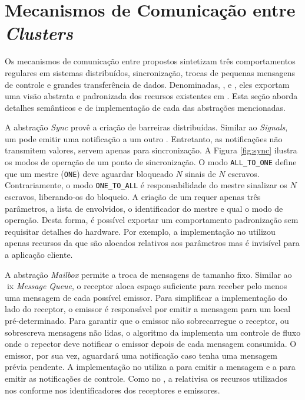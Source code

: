 \section{Mecanismos de Comunicação entre \textit{Clusters}}
\label{sec:mecanismos}

	Os mecanismos de comunicação entre \clusters propostos sintetizam três
	comportamentos regulares em sistemas distribuídos, \ie sincronização,
	trocas de pequenas mensagens de controle e grandes transferência de dados.
	Denominadas, \sync, \mailbox e \portal, eles
	exportam uma visão abstrata e padronizada dos recursos existentes em \lws.
	Esta seção aborda detalhes semânticos e de implementação de cada das
	abstrações mencionadas.

	A abstração \textit{Sync} provê a criação de barreiras distribuídas.
	Similar ao \posix \textit{Signals}, um \cluster pode emitir uma notificação
	a um outro \cluster. Entretanto, as notificações não transmitem valores,
	servem apenas para sincronização.
	A Figura \ref{fig:sync} ilustra os modos de operação de um ponto de
	sincronização. O modo \texttt{ALL\_TO\_ONE} define que um
	\cluster mestre (\texttt{ONE}) deve aguardar bloqueado $N$ sinais de $N$
	\clusters escravos. Contrariamente, o modo \texttt{ONE\_TO\_ALL}
	é responsabilidade do mestre sinalizar os $N$ escravos, liberando-os do
	bloqueio. 
	A criação de um \sync requer apenas três parâmetros, \ie a lista de
	\clusters envolvidos, o identificador do \cluster mestre e qual o modo de
	operação. Desta forma, é possível exportar um comportamento padronização
	sem requisitar detalhes do hardware.
	Por exemplo, a implementação no \mppa utilizou apenas recursos da \cnoc que
	são alocados relativos aos parâmetros mas é invisível para a aplicação
	cliente.

	A abstração \textit{Mailbox} permite a troca de mensagens de tamanho fixo.
	Similar ao \poix \textit{Message Queue}, o \cluster receptor aloca espaço
	suficiente para receber pelo menos uma mensagem de cada possível emissor.
	Para simplificar a implementação do lado do receptor, o emissor
	é responsável por emitir a mensagem para um local pré-determinado.
	Para garantir que o emissor não sobrecarregue o receptor, ou sobrescreva
	mensagens não lidas, o algoritmo da \mailbox implementa um controle de fluxo
	onde o repector deve notificar o emissor depois de cada mensagem consumida.
	O emissor, por sua vez, aguardará uma notificação caso tenha uma mensagem
	prévia pendente. A implementação no \mppa utiliza a \dnoc para emitir
	a mensagem e a \cnoc para emitir as notificações de controle.
	Como no \sync, a \mailbox relativisa os recursos utilizados nos conforme
	nos identificadores dos receptores e emissores.

